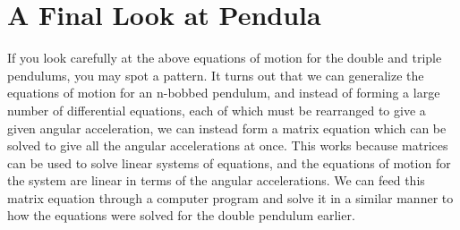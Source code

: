 \documentclass{article}
\begin{document}
\section{A Final Look at Pendula}

 If you look carefully at the above equations of motion for the double and triple pendulums, you may spot a pattern. It turns out that we can generalize the equations of motion for an n-bobbed pendulum, and instead of forming a large number of differential equations, each of which must be rearranged to give a given angular acceleration, we can instead form a matrix equation which can be solved to give all the angular accelerations at once. This works because matrices can be used to solve linear systems of equations, and the equations of motion for the system are linear in terms of the angular accelerations. We can feed this matrix equation through a computer program and solve it in a similar manner to how the equations were solved for the double pendulum earlier.
\end{document}
